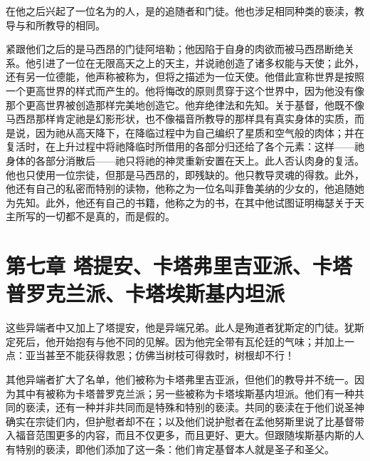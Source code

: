 在他之后兴起了一位名为的人，是的追随者和门徒。他也涉足相同种类的亵渎，教导与和所教导的相同。\par

紧跟他们之后的是马西昂的门徒阿培勒；他因陷于自身的肉欲而被马西昂断绝关系。他引进了一位在无限高天之上的天主，并说祂创造了诸多权能与天使；此外，还有另一位德能，他声称被称为，但将之描述为一位天使。他借此宣称世界是按照一个更高世界的样式而产生的。他将悔改的原则贯穿于这个世界中，因为他没有像那个更高世界被创造那样完美地创造它。他弃绝律法和先知。关于基督，他既不像马西昂那样肯定祂是幻影形状，也不像福音所教导的那样具有真实身体的实质，而是说，因为祂从高天降下，在降临过程中为自己编织了星质和空气般的肉体；并在复活时，在上升过程中将祂降临时所借用的各部分归还给了各个元素：这样——祂身体的各部分消散后——祂只将祂的神灵重新安置在天上。此人否认肉身的复活。他也只使用一位宗徒，但那是马西昂的，即残缺的。他只教导灵魂的得救。此外，他还有自己的私密而特别的读物，他称之为一位名叫菲鲁美纳的少女的，他追随她为先知。此外，他还有自己的书籍，他称之为的书，在其中他试图证明梅瑟关于天主所写的一切都不是真的，而是假的。\par


\section{第七章 塔提安、卡塔弗里吉亚派、卡塔普罗克兰派、卡塔埃斯基内坦派}

这些异端者中又加上了塔提安，他是异端兄弟。此人是殉道者犹斯定的门徒。犹斯定死后，他开始抱有与他不同的见解。因为他完全带有瓦伦廷的气味；并加上一点：亚当甚至不能获得救恩；仿佛当树枝可得救时，树根却不行！\par

其他异端者扩大了名单，他们被称为卡塔弗里吉亚派，但他们的教导并不统一。因为其中有被称为卡塔普罗克兰派；另一些被称为卡塔埃斯基内坦派。他们有一种共同的亵渎，还有一种并非共同而是特殊和特别的亵渎。共同的亵渎在于他们说圣神确实在宗徒们内，但护慰者却不在；以及他们说护慰者在孟他努斯里说了比基督带入福音范围更多的内容，而且不仅更多，而且更好、更大。但跟随埃斯基内斯的人有特别的亵渎，即他们添加了这一条：他们肯定基督本人就是圣子和圣父。\par



